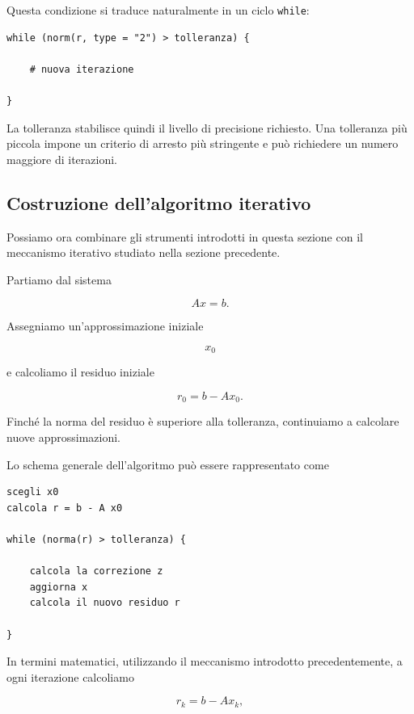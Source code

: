 Questa condizione si traduce naturalmente in un ciclo
\texttt{while}:

\begin{verbatim}
while (norm(r, type = "2") > tolleranza) {

    # nuova iterazione

}
\end{verbatim}

La tolleranza stabilisce quindi il livello di precisione richiesto.
Una tolleranza più piccola impone un criterio di arresto più
stringente e può richiedere un numero maggiore di iterazioni.


\subsection{Costruzione dell'algoritmo iterativo}

Possiamo ora combinare gli strumenti introdotti in questa sezione
con il meccanismo iterativo studiato nella sezione precedente.

Partiamo dal sistema

\begin{equation*}
    Ax=b.
\end{equation*}

Assegniamo un'approssimazione iniziale

\begin{equation*}
    x_0
\end{equation*}

e calcoliamo il residuo iniziale

\begin{equation*}
    r_0=b-Ax_0.
\end{equation*}

Finché la norma del residuo è superiore alla tolleranza,
continuiamo a calcolare nuove approssimazioni.

Lo schema generale dell'algoritmo può essere rappresentato come

\begin{verbatim}
scegli x0
calcola r = b - A x0

while (norma(r) > tolleranza) {

    calcola la correzione z
    aggiorna x
    calcola il nuovo residuo r

}
\end{verbatim}

In termini matematici, utilizzando il meccanismo introdotto
precedentemente, a ogni iterazione calcoliamo

\begin{equation*}
    r_k=b-Ax_k,
\end{equation*}

